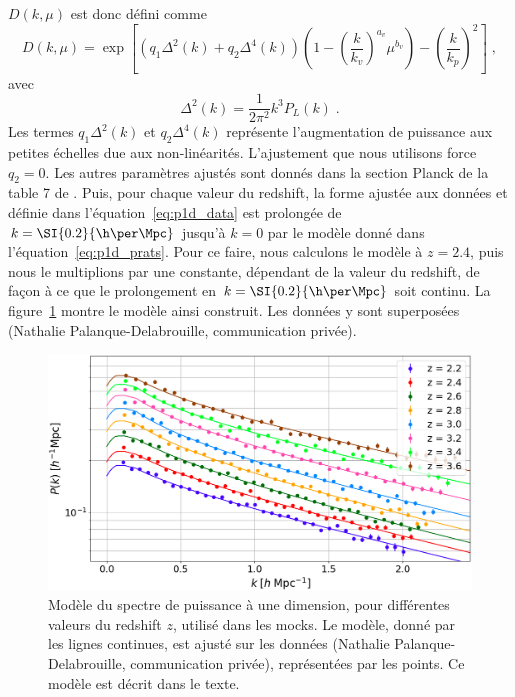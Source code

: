$D(k,\mu)$ est donc défini comme
\begin{equation}
  \label{eq:p1d_prats}
  D(k, \mu) = \exp\left[
    \left(q_1 \Delta^2(k) + q_2 \Delta^4(k) \right) \left(1 - \left(\frac{k}{k_v}\right)^{a_v} \mu^{b_v} \right)
    - \left(\frac{k}{k_p} \right)^2 
  \right]
  \; ,
\end{equation}
avec
\begin{equation}
  \Delta^2(k) = \frac{1}{2 \pi^2} k^3 P_L(k) \; .
\end{equation}
Les termes $q_1 \Delta^2(k)$ et $q_2 \Delta^4(k)$ représente l'augmentation de puissance aux petites échelles due aux non-linéarités. L'ajustement que nous utilisons force $q_2 = 0$. Les autres paramètres ajustés sont donnés dans la section \og Planck \fg de la table 7 de \textcite{Arinyo-i-Prats2015}.
Puis, pour chaque valeur du redshift, la forme ajustée aux données et définie dans l'équation~\ref{eq:p1d_data} est prolongée de $k = \SI{0.2}{\h\per\Mpc}$ jusqu'à $k = 0$ par le modèle donné dans l'équation~\ref{eq:p1d_prats}.
Pour ce faire, nous calculons le modèle à $z = \num{2.4}$, puis nous le multiplions par une constante, dépendant de la valeur du redshift, de façon à ce que le prolongement en $k = \SI{0.2}{\h\per\Mpc}$ soit continu.
La figure~\ref{fig:p1d_data} montre le modèle ainsi construit. Les données y sont superposées (Nathalie Palanque-Delabrouille, communication privée).
\begin{figure}
  \centering
  \includegraphics[scale=0.35]{p1d_model_data}
  \caption{Modèle du spectre de puissance à une dimension, pour différentes valeurs du redshift $z$, utilisé dans les mocks. Le modèle, donné par les lignes continues, est ajusté sur les données (Nathalie Palanque-Delabrouille, communication privée), représentées par les points. Ce modèle est décrit dans le texte.}
  \label{fig:p1d_data}
\end{figure}

